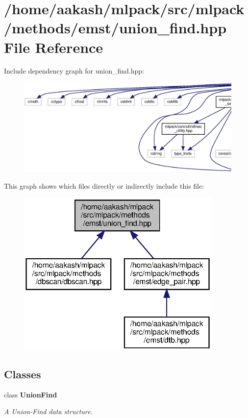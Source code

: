 \section{/home/aakash/mlpack/src/mlpack/methods/emst/union\+\_\+find.hpp File Reference}
\label{union__find_8hpp}
Include dependency graph for union\+\_\+find.\+hpp\+:
\nopagebreak
\begin{figure}[H]
\begin{center}
\leavevmode
\includegraphics[width=350pt]{union__find_8hpp__incl}
\end{center}
\end{figure}
This graph shows which files directly or indirectly include this file\+:
\nopagebreak
\begin{figure}[H]
\begin{center}
\leavevmode
\includegraphics[width=288pt]{union__find_8hpp__dep__incl}
\end{center}
\end{figure}
\subsection*{Classes}
\begin{DoxyCompactItemize}
\item 
class \textbf{ Union\+Find}
\begin{DoxyCompactList}\small\item\em A Union-\/\+Find data structure. \end{DoxyCompactList}\end{DoxyCompactItemize}
